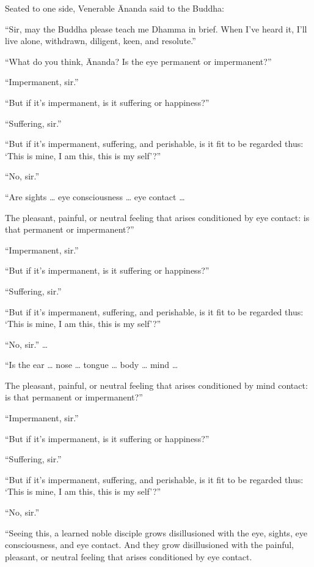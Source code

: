 \documentclass[12pt,openany]{book}%
\begin{document}
Seated to one side, Venerable Ānanda said to the Buddha: 

“Sir, may the Buddha please teach me Dhamma in brief. When I’ve heard it, I’ll live alone, withdrawn, diligent, keen, and resolute.” 

“What do you think, Ānanda? Is the eye permanent or impermanent?” 

“Impermanent, sir.” 

“But if it’s impermanent, is it suffering or happiness?” 

“Suffering, sir.” 

“But if it’s impermanent, suffering, and perishable, is it fit to be regarded thus: ‘This is mine, I am this, this is my self’?” 

“No, sir.” 

“Are sights … eye consciousness … eye contact … 

The pleasant, painful, or neutral feeling that arises conditioned by eye contact: is that permanent or impermanent?” 

“Impermanent, sir.” 

“But if it’s impermanent, is it suffering or happiness?” 

“Suffering, sir.” 

“But if it’s impermanent, suffering, and perishable, is it fit to be regarded thus: ‘This is mine, I am this, this is my self’?” 

“No, sir.” … 

“Is the ear … nose … tongue … body … mind … 

The pleasant, painful, or neutral feeling that arises conditioned by mind contact: is that permanent or impermanent?” 

“Impermanent, sir.” 

“But if it’s impermanent, is it suffering or happiness?” 

“Suffering, sir.” 

“But if it’s impermanent, suffering, and perishable, is it fit to be regarded thus: ‘This is mine, I am this, this is my self’?” 

“No, sir.” 

“Seeing this, a learned noble disciple grows disillusioned with the eye, sights, eye consciousness, and eye contact. And they grow disillusioned with the painful, pleasant, or neutral feeling that arises conditioned by eye contact. 
\end{document}
